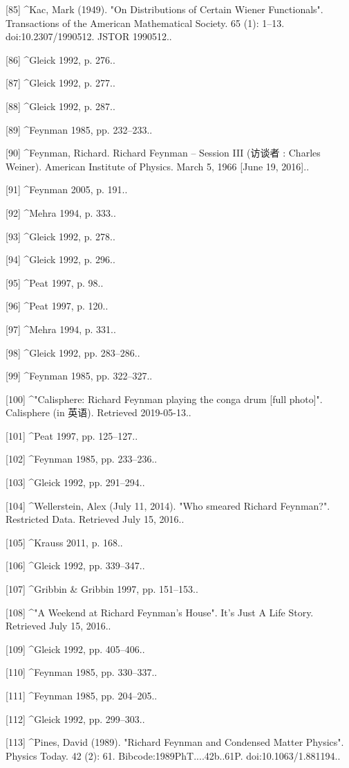 [85]
^Kac, Mark (1949). "On Distributions of Certain Wiener Functionals". Transactions of the American Mathematical Society. 65 (1): 1–13. doi:10.2307/1990512. JSTOR 1990512..

[86]
^Gleick 1992, p. 276..

[87]
^Gleick 1992, p. 277..

[88]
^Gleick 1992, p. 287..

[89]
^Feynman 1985, pp. 232–233..

[90]
^Feynman, Richard. Richard Feynman – Session III (访谈者 : Charles Weiner). American Institute of Physics. March 5, 1966 [June 19, 2016]..

[91]
^Feynman 2005, p. 191..

[92]
^Mehra 1994, p. 333..

[93]
^Gleick 1992, p. 278..

[94]
^Gleick 1992, p. 296..

[95]
^Peat 1997, p. 98..

[96]
^Peat 1997, p. 120..

[97]
^Mehra 1994, p. 331..

[98]
^Gleick 1992, pp. 283–286..

[99]
^Feynman 1985, pp. 322–327..

[100]
^"Calisphere: Richard Feynman playing the conga drum [full photo]". Calisphere (in 英语). Retrieved 2019-05-13..

[101]
^Peat 1997, pp. 125–127..

[102]
^Feynman 1985, pp. 233–236..

[103]
^Gleick 1992, pp. 291–294..

[104]
^Wellerstein, Alex (July 11, 2014). "Who smeared Richard Feynman?". Restricted Data. Retrieved July 15, 2016..

[105]
^Krauss 2011, p. 168..

[106]
^Gleick 1992, pp. 339–347..

[107]
^Gribbin & Gribbin 1997, pp. 151–153..

[108]
^"A Weekend at Richard Feynman's House". It's Just A Life Story. Retrieved July 15, 2016..

[109]
^Gleick 1992, pp. 405–406..

[110]
^Feynman 1985, pp. 330–337..

[111]
^Feynman 1985, pp. 204–205..

[112]
^Gleick 1992, pp. 299–303..

[113]
^Pines, David (1989). "Richard Feynman and Condensed Matter Physics". Physics Today. 42 (2): 61. Bibcode:1989PhT....42b..61P. doi:10.1063/1.881194..

